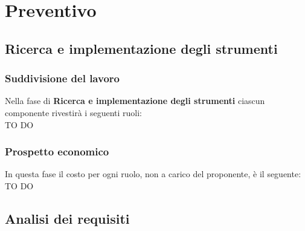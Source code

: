 %
%


\section{Preventivo} %
\label{sec:preventivo}
	\subsection{Ricerca e implementazione degli strumenti} %
	\label{sub:ricerca_e_implementazione_degli_strumenti}
		\subsubsection{Suddivisione del lavoro} %
		\label{ssub:suddivisione_del_lavoro}
		Nella fase di \textbf{Ricerca e implementazione degli strumenti} ciascun componente rivestirà i seguenti ruoli: \\
		TO DO
		
		\subsubsection{Prospetto economico} %
		\label{ssub:prospetto_economico}
		In questa fase il costo per ogni ruolo, non a carico del proponente, è il seguente: \\
		TO DO
		
	
	
	\subsection{Analisi dei requisiti} %
	\label{sub:analisi_dei_requisiti}
